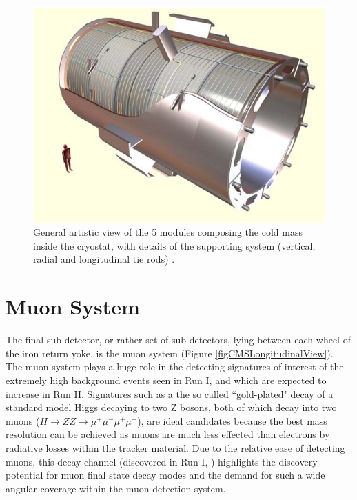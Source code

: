 \begin{figure} \label{fig-SuperconductingSolenoid}
\begin{center}
\includegraphics[scale=0.5]{Figures/SuperconductingSolenoid.png}
\caption{ General artistic view of the 5 modules composing the cold mass inside the cryostat, with details of the supporting system (vertical, radial and longitudinal tie rods) \cite{CMSexperiment}.}
\end{center}
\end{figure}


\section{Muon System} \label{sec-MuonSystem}

The final sub-detector, or rather set of sub-detectors, lying between each wheel of the iron return yoke, is the muon system (Figure \ref{figCMSLongitudinalView}). The muon system plays a huge role in the detecting signatures of interest of the extremely high background events seen in Run I, and which are expected to increase in Run II. Signatures such as a the so called ``gold-plated" decay of a standard model Higgs decaying to two Z bosons, both of which decay into two muons ($H \to ZZ \to \mu^+ \mu^- \mu^+ \mu^-$), are ideal candidates because the best mass resolution can be achieved as muons are much less effected than electrons by radiative losses within the tracker material. Due to the relative ease of detecting muons, this decay channel (discovered in Run I, \cite{}) highlights the discovery potential for muon final state decay modes and the demand for such a wide angular coverage within the muon detection system. 

